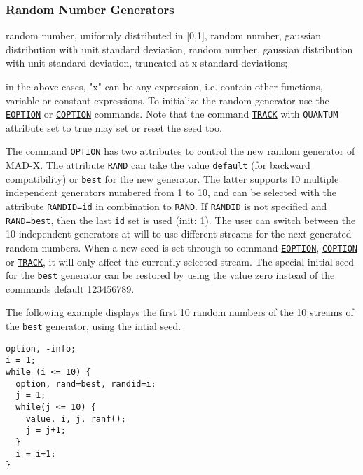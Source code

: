 \subsubsection{Random Number Generators}
\label{subsubsec:random}
\begin{madlist}
   random number, uniformly distributed in [0,1], 
   random number, gaussian distribution with unit
  standard deviation,  
   random number, gaussian distribution with unit
  standard deviation, truncated at x standard deviations;  
\end{madlist}

in the above cases, "x" can be any expression, i.e. contain other
functions, variable or constant expressions. To initialize the \madx
random generator use the \hyperref[sec:eoption]{\texttt{EOPTION}} or  \hyperref[sec:coption]{\texttt{COPTION}} commands. Note that the command \hyperref[sec:track]{\texttt{TRACK}} with \texttt{QUANTUM} attribute set to true may set or reset the seed too. 

The command  \hyperref[sec:option]{\texttt{OPTION}} has two attributes to control the new random generator of MAD-X. The attribute \texttt{RAND} can take the value \texttt{default} (for backward compatibility) or \texttt{best} for the new generator. The latter supports 10 multiple independent generators numbered from 1 to 10, and can be selected with the attribute \texttt{RANDID=id} in combination to \texttt{RAND}. If \texttt{RANDID} is not specified and \texttt{RAND=best}, then the last \texttt{id} set is used (init: 1). The user can switch between the 10 independent generators at will to use different streams for the next generated random numbers. When a new seed is set through to command \hyperref[sec:eoption]{\texttt{EOPTION}},  \hyperref[sec:coption]{\texttt{COPTION}} or \hyperref[sec:track]{\texttt{TRACK}}, it will only affect the currently selected stream. The special initial seed for the \texttt{best} generator can be restored by using the value zero instead of the commands default 123456789. 

The following example displays the first 10 random numbers of the 10 streams of the \texttt{best} generator, using the intial seed.

\begin{verbatim}
option, -info;
i = 1;
while (i <= 10) {
  option, rand=best, randid=i;
  j = 1;
  while(j <= 10) {
    value, i, j, ranf();
    j = j+1;
  }
  i = i+1;
}
\end{verbatim}

